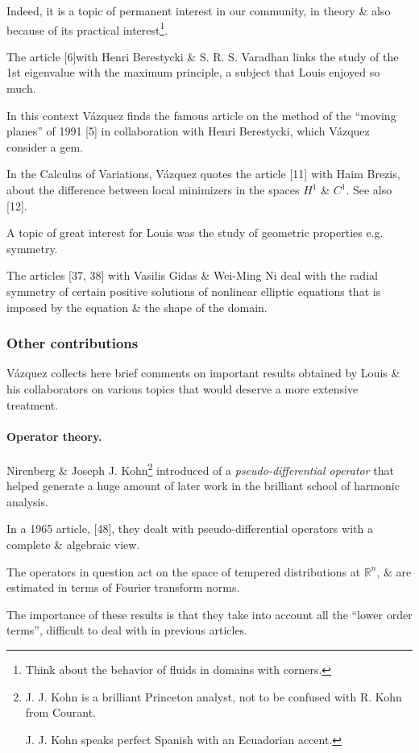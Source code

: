 \documentclass{article}
\begin{document}
Indeed, it is a topic of permanent interest in our community, in theory \& also because of its practical interest\footnote{Think about the behavior of fluids in domains with corners.}.

%
The article [6]with Henri Berestycki \& S. R. S. Varadhan links the study of the 1st eigenvalue with the maximum principle, a subject that Louis enjoyed so much.

In this context V\'azquez finds the famous article on the method of the ``moving planes'' of 1991 [5] in collaboration with Henri Berestycki, which V\'azquez consider a gem.

%
In the Calculus of Variations, V\'azquez quotes the article [11] with Haim Brezis, about the difference between local minimizers in the spaces $H^1$ \& $C^1$. See also [12].

%
A topic of great interest for Louis was the study of geometric properties e.g. symmetry.

The articles [37, 38] with Vasilis Gidas \& Wei-Ming Ni deal with the radial symmetry of certain positive solutions of nonlinear elliptic equations that is imposed by the equation \& the shape of the domain.

\subsubsection{Other contributions}
V\'azquez collects here brief comments on important results obtained by Louis \& his collaborators on various topics that would deserve a more extensive treatment.

\paragraph{Operator theory.} Nirenberg \& Joseph J. Kohn\footnote{J. J. Kohn is a brilliant Princeton analyst, not to be confused with R. Kohn from Courant.
	
	J. J. Kohn speaks perfect Spanish with an Ecuadorian accent.} introduced of a \textit{pseudo-differential operator} that helped generate a huge amount of later work in the brilliant school of harmonic analysis.

In a 1965 article, [48], they dealt with pseudo-differential operators with a complete \& algebraic view.

The operators in question act on the space of tempered distributions at $\mathbb{R}^n$, \& are estimated in terms of Fourier transform norms.

The importance of these results is that they take into account all the ``lower order terms'', difficult to deal with in previous articles.
\end{document}
